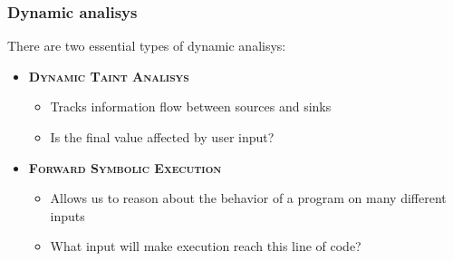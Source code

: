 \begin{frame}
	\frametitle{Dynamic analisys}
	There are two essential types of dynamic analisys: \newline
	\begin{itemize}
		\item<2-> \textsc{\textbf{Dynamic Taint Analisys}}
			\begin{itemize}
				\item Tracks information flow between sources and sinks
				\item Is the final value affected by user input?
			\end{itemize}
		\item<3-> \textsc{\textbf{Forward Symbolic Execution}}
			\begin{itemize}
				\item Allows us to reason about the behavior of a program on many different inputs
				\item What input will make execution reach this line of code?
			\end{itemize}
	\end{itemize}
\end{frame}